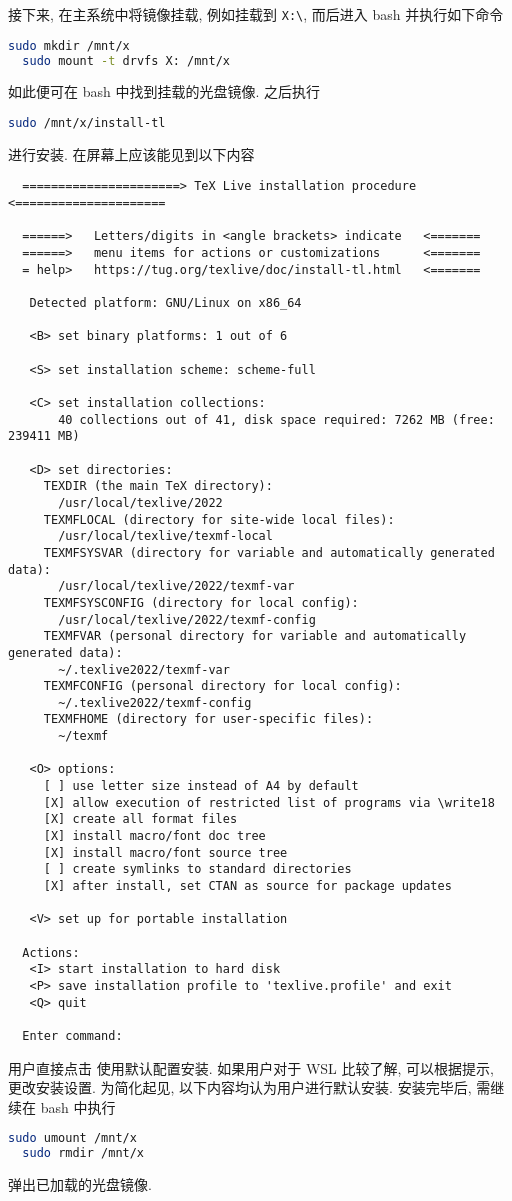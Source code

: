 接下来, 在主系统中将镜像挂载,
例如挂载到 \texttt{X:\textbackslash},
而后进入 \textsf{bash} 并执行如下命令
\begin{lstlisting}[language = bash]
  sudo mkdir /mnt/x
  sudo mount -t drvfs X: /mnt/x
\end{lstlisting}
如此便可在 \textsf{bash} 中找到挂载的光盘镜像.
之后执行
\begin{lstlisting}[language = bash]
  sudo /mnt/x/install-tl
\end{lstlisting}
进行安装.
在屏幕上应该能见到以下内容
\begin{lstlisting}
  ======================> TeX Live installation procedure <=====================
  
  ======>   Letters/digits in <angle brackets> indicate   <=======
  ======>   menu items for actions or customizations      <=======
  = help>   https://tug.org/texlive/doc/install-tl.html   <=======
  
   Detected platform: GNU/Linux on x86_64
   
   <B> set binary platforms: 1 out of 6
  
   <S> set installation scheme: scheme-full
  
   <C> set installation collections:
       40 collections out of 41, disk space required: 7262 MB (free: 239411 MB)
  
   <D> set directories:
     TEXDIR (the main TeX directory):
       /usr/local/texlive/2022
     TEXMFLOCAL (directory for site-wide local files):
       /usr/local/texlive/texmf-local
     TEXMFSYSVAR (directory for variable and automatically generated data):
       /usr/local/texlive/2022/texmf-var
     TEXMFSYSCONFIG (directory for local config):
       /usr/local/texlive/2022/texmf-config
     TEXMFVAR (personal directory for variable and automatically generated data):
       ~/.texlive2022/texmf-var
     TEXMFCONFIG (personal directory for local config):
       ~/.texlive2022/texmf-config
     TEXMFHOME (directory for user-specific files):
       ~/texmf
  
   <O> options:
     [ ] use letter size instead of A4 by default
     [X] allow execution of restricted list of programs via \write18
     [X] create all format files
     [X] install macro/font doc tree
     [X] install macro/font source tree
     [ ] create symlinks to standard directories
     [X] after install, set CTAN as source for package updates
  
   <V> set up for portable installation
  
  Actions:
   <I> start installation to hard disk
   <P> save installation profile to 'texlive.profile' and exit
   <Q> quit
  
  Enter command: 
\end{lstlisting}
用户直接点击  使用默认配置安装.
如果用户对于 WSL 比较了解, 可以根据提示, 更改安装设置.
为简化起见,
以下内容均认为用户进行默认安装.
安装完毕后, 需继续在 \textsf{bash} 中执行
\begin{lstlisting}[language = bash]
  sudo umount /mnt/x
  sudo rmdir /mnt/x
\end{lstlisting}
弹出已加载的光盘镜像.

